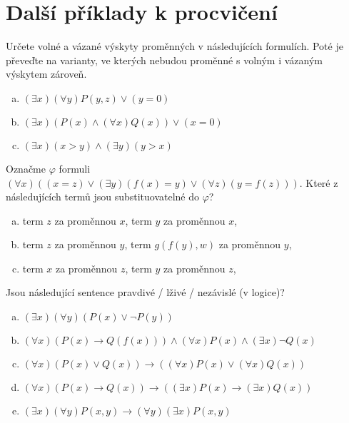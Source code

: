         
\section*{Další příklady k procvičení}


\begin{problem}

    Určete volné a vázané výskyty proměnných v následujících formulích. Poté je převeďte na varianty, ve kterých nebudou proměnné s volným i vázaným výskytem zároveň.
    \begin{enumerate}[(a)]
        \item $(\exists x)(\forall y)P(y,z) \vee (y=0)$
        \item $(\exists x)(P(x) \wedge (\forall x)Q(x)) \vee (x=0)$
        \item $(\exists x)(x>y) \wedge (\exists y)(y>x)$
    \end{enumerate}

\end{problem}


\begin{problem}
    
    Označme $\varphi$ formuli $(\forall x)((x=z) \vee (\exists y)(f(x)=y) \vee (\forall z)(y=f(z)))$. Které z následujících termů jsou substituovatelné do $\varphi$?
    \begin{enumerate}[(a)]
        \item term $z$ za proměnnou $x$, term $y$ za proměnnou $x$,
        \item term $z$ za proměnnou $y$, term $g(f(y),w)$ za proměnnou $y$,
        \item term $x$ za proměnnou $z$, term $y$ za proměnnou $z$,
    \end{enumerate}

\end{problem}


\begin{problem}

    Jsou následující sentence pravdivé / lživé / nezávislé (v logice)?

    \begin{enumerate}[(a)]
        \item $(\exists x)(\forall y)(P(x) \vee \neg P(y))$
        \item $(\forall x)(P(x)\to Q(f(x))) \wedge (\forall x)P(x) \wedge (\exists x)\neg Q(x)$
        \item $(\forall x)(P(x) \vee Q(x)) \to ((\forall x)P(x) \vee (\forall x)Q(x))$
        \item $(\forall x)(P(x)\to Q(x)) \to ((\exists x)P(x)\to(\exists x)Q(x))$
        \item $(\exists x)(\forall y)P(x,y) \to (\forall y)(\exists x)P(x,y)$
    \end{enumerate}

\end{problem}


